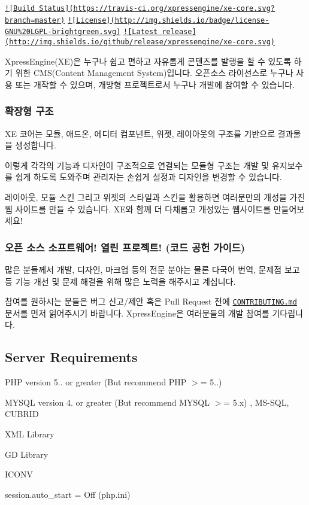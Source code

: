 \href{https://travis-ci.org/xpressengine/xe-core}{\tt !\mbox{[}Build Status\mbox{]}(https\-://travis-\/ci.\-org/xpressengine/xe-\/core.\-svg?branch=master)} \href{http://www.gnu.org/licenses/gpl.html}{\tt !\mbox{[}License\mbox{]}(http\-://img.\-shields.\-io/badge/license-\/\-G\-N\-U\%20\-L\-G\-P\-L-\/brightgreen.\-svg)} \href{https://github.com/xpressengine/xe-core/releases}{\tt !\mbox{[}Latest release\mbox{]}(http\-://img.\-shields.\-io/github/release/xpressengine/xe-\/core.\-svg)}

Xpress\-Engine(\-X\-E)은 누구나 쉽고 편하고 자유롭게 콘텐츠를 발행을 할 수 있도록 하기 위한 C\-M\-S(\-Content Management System)입니다. 오픈소스 라이선스로 누구나 사용 또는 개작할 수 있으며, 개방형 프로젝트로서 누구나 개발에 참여할 수 있습니다.

\subsubsection*{확장형 구조}

X\-E 코어는 모듈, 애드온, 에디터 컴포넌트, 위젯, 레이아웃의 구조를 기반으로 결과물을 생성합니다.

이렇게 각각의 기능과 디자인이 구조적으로 연결되는 모듈형 구조는 개발 및 유지보수를 쉽게 하도록 도와주며 관리자는 손쉽게 설정과 디자인을 변경할 수 있습니다.

레이아웃, 모듈 스킨 그리고 위젯의 스타일과 스킨을 활용하면 여러분만의 개성을 가진 웹 사이트를 만들 수 있습니다. X\-E와 함께 더 다채롭고 개성있는 웹사이트를 만들어보세요!

\subsubsection*{오픈 소스 소프트웨어! 열린 프로젝트! (코드 공헌 가이드)}

많은 분들께서 개발, 디자인, 마크업 등의 전문 분야는 물론 다국어 번역, 문제점 보고 등 기능 개선 및 문제 해결을 위해 많은 노력을 해주시고 계십니다.

참여를 원하시는 분들은 버그 신고/제안 혹은 Pull Request 전에 \href{./CONTRIBUTING.md}{\tt C\-O\-N\-T\-R\-I\-B\-U\-T\-I\-N\-G.\-md} 문서를 먼저 읽어주시기 바랍니다. Xpress\-Engine은 여러분들의 개발 참여를 기다립니다.

\subsection*{Server Requirements}


\begin{DoxyItemize}
\item P\-H\-P version 5.. or greater (But recommend P\-H\-P $>$= 5..)
\item M\-Y\-S\-Q\-L version 4. or greater (But recommend M\-Y\-S\-Q\-L $>$= 5.\-x) , M\-S-\/\-S\-Q\-L, C\-U\-B\-R\-I\-D
\item X\-M\-L Library
\item G\-D Library
\item I\-C\-O\-N\-V
\item session.\-auto\-\_\-start = Off (php.\-ini)
\end{DoxyItemize}

